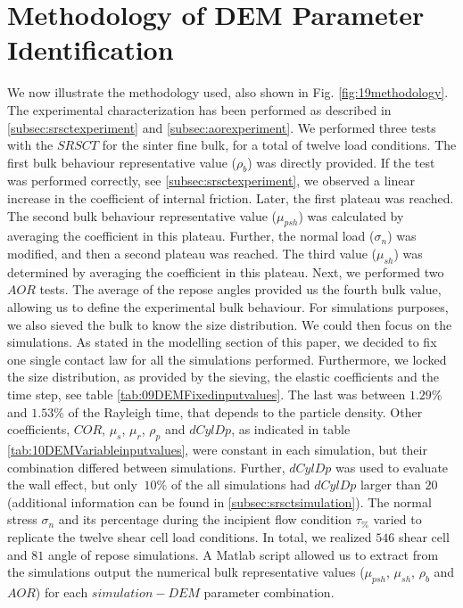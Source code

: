\section{Methodology of DEM Parameter Identification}
\label{sec:methodology}

We now illustrate the methodology used, also shown in Fig.
\ref{fig:19methodology}.
The experimental characterization has been performed as described in
\ref{subsec:srsctexperiment} and \ref{subsec:aorexperiment}. We performed
three tests with the $SRSCT$ for the sinter fine bulk, for a total of twelve
load conditions. 
The first bulk behaviour representative value ($\rho_b$) was directly provided. 
If the test was performed correctly, see \ref{subsec:srsctexperiment}, we
observed a linear increase in the coefficient of internal friction.
Later, the first plateau was reached. 
The second bulk behaviour representative value ($\mu_{psh}$) was calculated by averaging the coefficient in this plateau. 
Further, the normal load ($\sigma_n$) was modified, and then a second plateau
was reached.
The third value ($\mu_{sh}$) was determined by averaging the coefficient in this plateau. 
Next, we performed two $AOR$ tests. 
The average of the repose angles provided us the fourth bulk value, allowing us
to define the experimental bulk behaviour.
For simulations purposes, we also sieved the bulk to know the size distribution.
We could then focus on the simulations. 
As stated in the modelling section of this paper, we decided to fix one single
contact law for all the simulations performed.
Furthermore, we locked the size distribution, as provided by the sieving, the
elastic coefficients and the time step, see table
\ref{tab:09DEMFixedinputvalues}.
The last was between $1.29 \%$ and $1.53 \%$ of the Rayleigh time, that depends
to the particle density.
Other coefficients, $COR$, $\mu_s$, $\mu_r$,
$\rho_p$ and $dCylDp$, as indicated in table \ref{tab:10DEMVariableinputvalues},
were constant in each simulation, but their combination differed between
simulations.
Further, $dCylDp$ was used to evaluate the wall effect, but only $~10\%$ of the
all simulations had $dCylDp$ larger than $20$ (additional information can be found in \ref{subsec:srsctsimulation}). 
The normal stress $\sigma_n$ and its
percentage during the incipient flow condition $\tau_{\%}$
varied to replicate the twelve shear cell load conditions. 
In total, we realized $546$ shear cell and $81$ angle of repose simulations.
A Matlab script allowed us to extract from the simulations output the numerical
bulk representative values ($\mu_{psh}$, $\mu_{sh}$, $\rho_b$ and $AOR$) for each $simulation-DEM$ parameter combination. 
